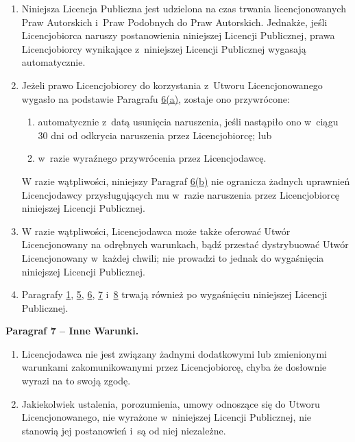 \documentclass[oneside,polish,11pt,rmheadings]{mwbk}
\begin{document}
\begin{enumerate}
\item  Niniejsza Licencja Publiczna jest udzielona na czas trwania licencjonowanych Praw Autorskich i~Praw Podobnych do Praw Autorskich. Jednakże, jeśli Licencjobiorca naruszy postanowienia niniejszej Licencji Publicznej, prawa Licencjobiorcy wynikające z~niniejszej Licencji Publicznej wygasają automatycznie.  
\item  Jeżeli prawo Licencjobiorcy do korzystania z~Utworu Licencjonowanego wygasło na podstawie Paragrafu \href{about:reader?url=https%3A%2F%2Fcreativecommons.org%2Flicenses%2Fby-nc-sa%2F4.0%2Flegalcode.pl#s6a}{6(a)}, 
zostaje ono przywrócone: 
\begin{enumerate}
\item  automatycznie z~datą usunięcia naruszenia, jeśli nastąpiło ono w~ciągu 30 dni od odkrycia naruszenia przez Licencjobiorcę; lub  
\item  w~razie wyraźnego przywrócenia przez Licencjodawcę.  \end{enumerate}
W razie wątpliwości, niniejszy Paragraf \href{about:reader?url=https%3A%2F%2Fcreativecommons.org%2Flicenses%2Fby-nc-sa%2F4.0%2Flegalcode.pl#s6b}{6(b)} 
nie ogranicza żadnych uprawnień Licencjodawcy przysługujących mu w~razie naruszenia przez Licencjobiorcę niniejszej Licencji Publicznej.  
\item  W razie wątpliwości, Licencjodawca może także oferować Utwór Licencjonowany na odrębnych warunkach, bądź przestać dystrybuować Utwór Licencjonowany w~każdej chwili; nie prowadzi to jednak do wygaśnięcia niniejszej Licencji Publicznej.  
\item  Paragrafy \href{about:reader?url=https%3A%2F%2Fcreativecommons.org%2Flicenses%2Fby-nc-sa%2F4.0%2Flegalcode.pl#s1}{1}, \href{about:reader?url=https%3A%2F%2Fcreativecommons.org%2Flicenses%2Fby-nc-sa%2F4.0%2Flegalcode.pl#s5}{5}, \href{about:reader?url=https%3A%2F%2Fcreativecommons.org%2Flicenses%2Fby-nc-sa%2F4.0%2Flegalcode.pl#s6}{6}, \href{about:reader?url=https%3A%2F%2Fcreativecommons.org%2Flicenses%2Fby-nc-sa%2F4.0%2Flegalcode.pl#s7}{7} i~\href{about:reader?url=https%3A%2F%2Fcreativecommons.org%2Flicenses%2Fby-nc-sa%2F4.0%2Flegalcode.pl#s8}{8} 
trwają również po wygaśnięciu niniejszej Licencji Publicznej.  \end{enumerate}
\textbf{Paragraf 7 – Inne Warunki.} 
\begin{enumerate}
\item  Licencjodawca nie jest związany żadnymi dodatkowymi lub zmienionymi warunkami zakomunikowanymi przez Licencjobiorcę, chyba że dosłownie wyrazi na to swoją zgodę.  \item  Jakiekolwiek ustalenia, porozumienia, umowy odnoszące się do Utworu Licencjonowanego, nie wyrażone w~niniejszej Licencji Publicznej, nie stanowią jej postanowień i~są od niej niezależne.  
\end{enumerate}
\end{document}
